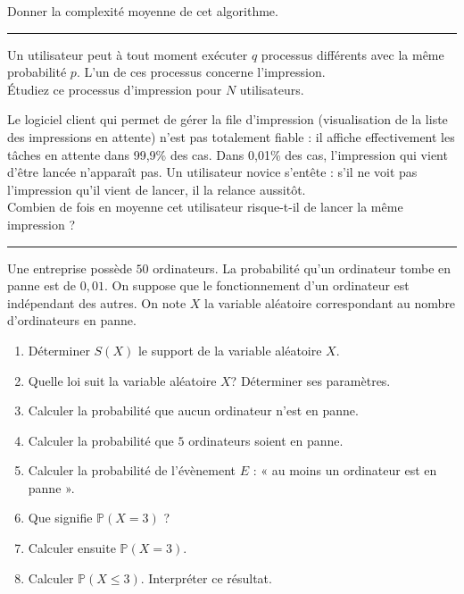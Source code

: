 \documentclass[../PolyS4.tex]{subfiles}
\begin{document}
 Donner la complexité moyenne de cet algorithme.\\
 
 \hfill\break
\hrule
\hfill\break


Un utilisateur peut à tout moment exécuter $q$ processus différents avec la même probabilité $p$. L'un de ces processus concerne l'impression.\\

 \' Etudiez ce processus d'impression pour $ N$ utilisateurs.\\

\newpage


Le logiciel client qui permet de gérer la file d'impression (visualisation de la liste des impressions en attente) n'est pas totalement fiable : il affiche effectivement les tâches en attente dans 99,9\% des cas. Dans 0,01\% des cas, l'impression qui vient d'être lancée n'apparaît pas. Un utilisateur novice s'entête : s'il ne voit pas l'impression qu'il vient de lancer, il la relance aussitôt. \\

Combien de fois en moyenne cet utilisateur risque-t-il de lancer la même impression ?\\


\hfill\break
\hrule
\hfill\break


Une entreprise possède $50$ ordinateurs. La probabilité qu'un ordinateur tombe en panne est de $0,01$. On suppose que le fonctionnement d'un ordinateur est indépendant des autres. On note $X$ la variable aléatoire correspondant au nombre d'ordinateurs en panne.\\

\begin{enumerate}
\item Déterminer $S(X)$ le support de la variable aléatoire $X$.
\item Quelle loi suit la variable aléatoire $ X $? Déterminer ses paramètres.
\item Calculer la probabilité que aucun ordinateur n'est en panne.
\item Calculer la probabilité que $5$ ordinateurs soient en panne. 
\item Calculer la probabilité de l'évènement $E$ : « au moins un ordinateur est en panne ».
\item Que signifie $\mathbb P (X = 3)$ ? 
\item Calculer ensuite $\mathbb P (X = 3)$.
\item Calculer $\mathbb P (X \leq 3)$. Interpréter ce résultat.\\
\end{enumerate}
\end{document}
